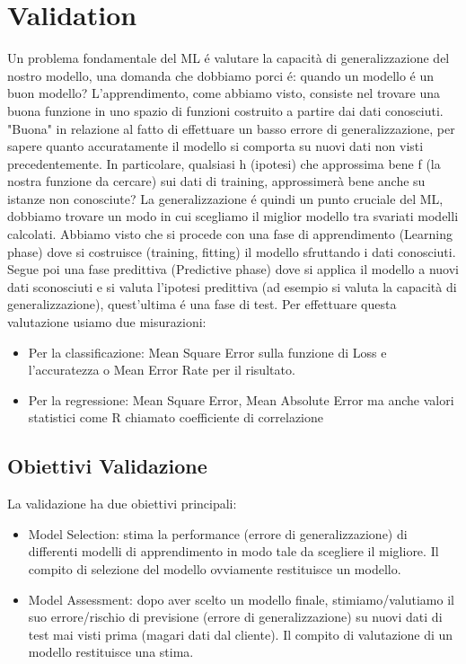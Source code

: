 \documentclass{article}
\begin{document}
\section{Validation}
Un problema fondamentale del ML é valutare la capacità di generalizzazione del nostro modello, una domanda che dobbiamo porci é: quando un modello é un buon modello? L'apprendimento, come abbiamo visto, consiste nel trovare una buona funzione in uno spazio di funzioni costruito a partire dai dati conosciuti. "Buona" in relazione al fatto di effettuare un basso errore di generalizzazione, per sapere quanto accuratamente il modello si comporta su nuovi dati non visti precedentemente. \newline 
In particolare, qualsiasi h (ipotesi) che approssima bene f (la nostra funzione da cercare) sui dati di training, approssimerà bene anche su istanze non conosciute? La generalizzazione é quindi un punto cruciale del ML, dobbiamo trovare un modo in cui scegliamo il miglior modello tra svariati modelli calcolati.
Abbiamo visto che si procede con una fase di apprendimento (Learning phase) dove si costruisce (training, fitting) il modello sfruttando i dati conosciuti. Segue poi una fase predittiva (Predictive phase) dove si applica il modello a nuovi dati sconosciuti e si valuta l'ipotesi predittiva (ad esempio si valuta la capacità di generalizzazione), quest'ultima é una fase di test. \newline
Per effettuare questa valutazione usiamo due misurazioni:
\begin{itemize}
    \item Per la classificazione: Mean Square Error sulla funzione di Loss e l'accuratezza o Mean Error Rate per il risultato.
    \item Per la regressione: Mean Square Error, Mean Absolute Error ma anche valori statistici come R chiamato coefficiente di correlazione
\end{itemize}

\subsection{Obiettivi Validazione}
La validazione ha due obiettivi principali:
\begin{itemize}
    \item Model Selection: stima la performance (errore di generalizzazione) di differenti modelli di apprendimento in modo tale da scegliere il migliore. Il compito di selezione del modello ovviamente restituisce un modello.
    \item Model Assessment: dopo aver scelto un modello finale, stimiamo/valutiamo il suo errore/rischio di previsione (errore di generalizzazione) su nuovi dati di test mai visti prima (magari dati dal cliente). Il compito di valutazione di un modello restituisce una stima.
\end{itemize}
\end{document}

